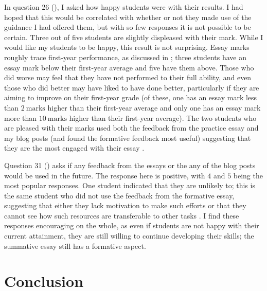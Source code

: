 In question 26 (), I asked how happy students were with their results. I had hoped that this would be correlated with whether or not they made use of the guidance I had offered them, but with so few responses it is not possible to be certain. Three out of five students are slightly displeased with their mark. While I would like my students to be happy, this result is not surprising. Essay marks roughly trace first-year performance, as discussed in ; three students have an essay mark below their first-year average and five have them above. Those who did worse may feel that they have not performed to their full ability, and even those who did better may have liked to have done better, particularly if they are aiming to improve on their first-year grade (of these, one has an essay mark less than $2~\mathrm{marks}$ higher than their first-year average and only one has an essay mark more than $10~\mathrm{marks}$ higher than their first-year average). The two students who are pleased with their marks used both the feedback from the practice essay and my blog posts (and found the formative feedback most useful) suggesting that they are the most engaged with their essay \citep[chapter 4]{Ramsden1992}.

Question 31 () asks if any feedback from the essays or the any of the blog posts would be used in the future. The response here is positive, with $4$ and $5$ being the most popular responses. One student indicated that they are unlikely to; this is the same student who did not use the feedback from the formative essay, suggesting that either they lack motivation to make such efforts or that they cannot see how such resources are transferable to other tasks \citep[cf.][]{Price2010}. I find these responses encouraging on the whole, as even if students are not happy with their current attainment, they are still willing to continue developing their skills; the summative essay still has a formative aspect.

\section{Conclusion}\label{sec:student-conc}

